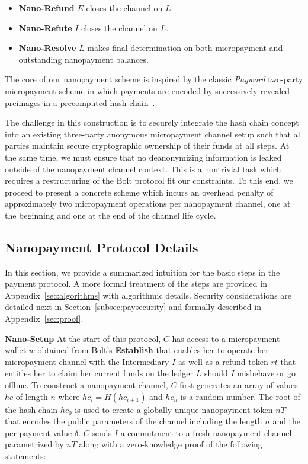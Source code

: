 \begin{itemize}
\item \textbf{Nano-Refund} $E$ closes the channel on $L$.
\item \textbf{Nano-Refute} $I$ closes the channel on $L$.
\item \textbf{Nano-Resolve} $L$ makes final determination on both micropayment
  and outstanding nanopayment balances.
\end{itemize}

The core of our nanopayment scheme is inspired by the classic \emph{Payword}
two-party micropayment scheme in which payments are encoded by successively
revealed preimages in a precomputed hash chain~\cite{rivest1996payword}.

The challenge in this construction is to securely integrate the hash chain
concept into an existing three-party anonymous micropayment channel setup such
that all parties maintain secure cryptographic ownership of their funds at all
steps. At the same time, we must ensure that no deanonymizing information is
leaked outside of the nanopayment channel context. This is a nontrivial task
which requires a restructuring of the Bolt protocol fit our constraints. To this
end, we proceed to present a concrete scheme which incurs an overhead penalty of
approximately two micropayment operations per nanopayment channel, one at the
beginning and one at the end of the channel life cycle.

\subsection{Nanopayment Protocol Details}
\label{sec:nanopaymentdetails}
In this section, we provide a summarized intuition for the basic steps in the
payment protocol. A more formal treatment of the steps are provided in
Appendix~\ref{sec:algorithms} with algorithmic details. Security considerations
are detailed next in Section~\ref{subsec:paysecurity} and formally described in
Appendix~\ref{sec:proof}.


\textbf{Nano-Setup} At the start of this protocol, $C$ has access to a
micropayment wallet $w$ obtained from Bolt's \textbf{Establish} that enables her
to operate her micropayment channel with the Intermediary $I$ as well as a
refund token $rt$ that entitles her to claim her current funds on the ledger $L$
should $I$ misbehave or go offline. To construct a nanopayment channel, $C$
first generates an array of values $hc$ of length $n$ where $hc_i = H(hc_{i+1})$
and $hc_n$ is a random number. The root of the hash chain $hc_0$ is used to
create a globally unique nanopayment token $nT$ that encodes the public
parameters of the channel including the length $n$ and the per-payment value
$\delta$. $C$ sends $I$ a commitment to a fresh nanopayment channel parametrized
by $nT$ along with a zero-knowledge proof of the following statements:

